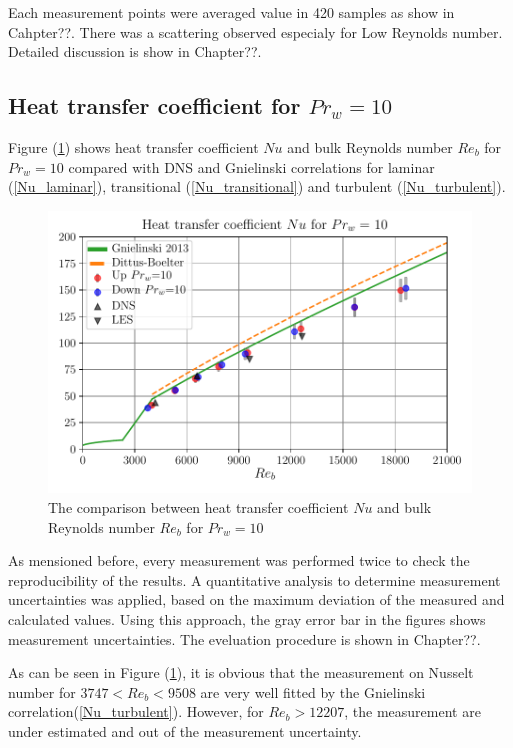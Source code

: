 \documentclass[12pt,oneside]{jbook}
\begin{document}
Each measurement points were averaged value in 420 samples as show in Cahpter??.
There was a scattering observed especialy for Low Reynolds number.
Detailed discussion is show in Chapter??.

\clearpage
\subsection{Heat transfer coefficient for $Pr_{w}=10$}
Figure (\ref{pr10_renu}) shows heat transfer coefficient $Nu$ and bulk Reynolds number $Re_{b}$ for $Pr_{w} = 10$ compared with DNS and Gnielinski correlations for laminar (\ref{Nu_laminar}), transitional (\ref{Nu_transitional}) and turbulent (\ref{Nu_turbulent}).

\begin{figure}[ht]
	\vspace{0zh}
	\begin{center}
		\includegraphics[width=0.9\linewidth]{fig/pr10_renu.pdf}
		\vspace{-1zh}
		\caption{The comparison between heat transfer coefficient $Nu$ and bulk Reynolds number $Re_{b}$ for $Pr_{w} = 10$}
		\label{pr10_renu}
	\end{center}
	\vspace{0zh}
\end{figure}

As mensioned before, every measurement was performed twice to check the reproducibility of the results.
A quantitative analysis to determine measurement uncertainties was applied, based on the maximum deviation of the measured and calculated values.
Using this approach, the gray error bar in the figures shows measurement uncertainties.
The eveluation procedure is shown in Chapter??.

As can be seen in Figure (\ref{pr10_renu}), it is obvious that the measurement on Nusselt number for $3747<Re_{b}<9508$ are very well fitted by the Gnielinski correlation(\ref{Nu_turbulent}).
However, for $Re_{b}>12207$, the measurement are under estimated and out of the measurement uncertainty.
\end{document}
